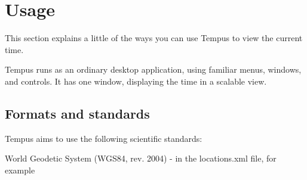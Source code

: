 \section{Usage}

This section explains a little of the ways you can use Tempus to view the current time.

Tempus runs as an ordinary desktop application, using familiar menus, windows, and controls. It has one window, displaying the time in a scalable view.

\subsection{Formats and standards}

Tempus aims to use the following scientific standards:

World Geodetic System (WGS84, rev. 2004) - in the locations.xml file, for example
